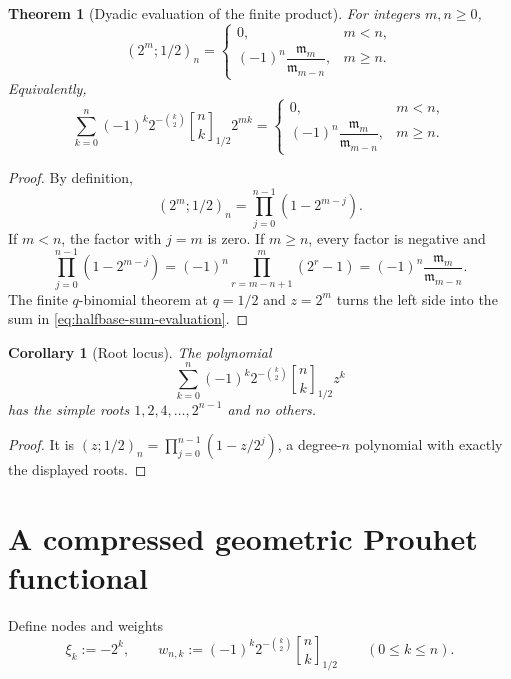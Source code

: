 \documentclass[11pt,oneside,openany]{book}
\newtheorem{theorem}{Theorem}[chapter]
\newtheorem{corollary}[corollary]{Corollary}
\theoremstyle{definition}
\theoremstyle{remark}
\newcommand{\Qbinom}[3]{\genfrac{[}{]}{0pt}{}{#1}{#2}_{#3}}
\begin{document}
\begin{theorem}[Dyadic evaluation of the finite product]\label{thm:dyadic-product-evaluation}
For integers $m,n\ge0$,
\begin{equation}\label{eq:dyadic-product-evaluation}
 (2^m;1/2)_n
 =
 \begin{cases}
  0,&m<n,\\[3pt]
  (-1)^n\dfrac{\mathfrak m_m}{\mathfrak m_{m-n}},&m\ge n.
 \end{cases}
\end{equation}
Equivalently,
\begin{equation}\label{eq:halfbase-sum-evaluation}
 \sum_{k=0}^{n}(-1)^k2^{-\binom k2}
 \Qbinom nk{1/2}2^{mk}
 =
 \begin{cases}
  0,&m<n,\\[3pt]
  (-1)^n\dfrac{\mathfrak m_m}{\mathfrak m_{m-n}},&m\ge n.
 \end{cases}
\end{equation}
\end{theorem}

\begin{proof}
By definition,
\[
 (2^m;1/2)_n=\prod_{j=0}^{n-1}(1-2^{m-j}).
\]
If $m<n$, the factor with $j=m$ is zero.  If $m\ge n$, every factor is negative and
\[
 \prod_{j=0}^{n-1}(1-2^{m-j})
 =(-1)^n\prod_{r=m-n+1}^{m}(2^r-1)
 =(-1)^n\frac{\mathfrak m_m}{\mathfrak m_{m-n}}.
\]
The finite $q$-binomial theorem at $q=1/2$ and $z=2^m$ turns the left side into the sum in \eqref{eq:halfbase-sum-evaluation}.
\end{proof}

\begin{corollary}[Root locus]\label{cor:halfbase-root-locus}
The polynomial
\[
 \sum_{k=0}^{n}(-1)^k2^{-\binom k2}\Qbinom nk{1/2}z^k
\]
has the simple roots $1,2,4,\ldots,2^{n-1}$ and no others.
\end{corollary}

\begin{proof}
It is $(z;1/2)_n=\prod_{j=0}^{n-1}(1-z/2^j)$, a degree-$n$ polynomial with exactly the displayed roots.
\end{proof}

\section{A compressed geometric Prouhet functional}

Define nodes and weights
\begin{equation}\label{eq:halfbase-prouhet-data}
 \xi_k:=-2^k,
 \qquad
 w_{n,k}:=(-1)^k2^{-\binom k2}\Qbinom nk{1/2}
 \qquad(0\le k\le n).
\end{equation}
\end{document}
